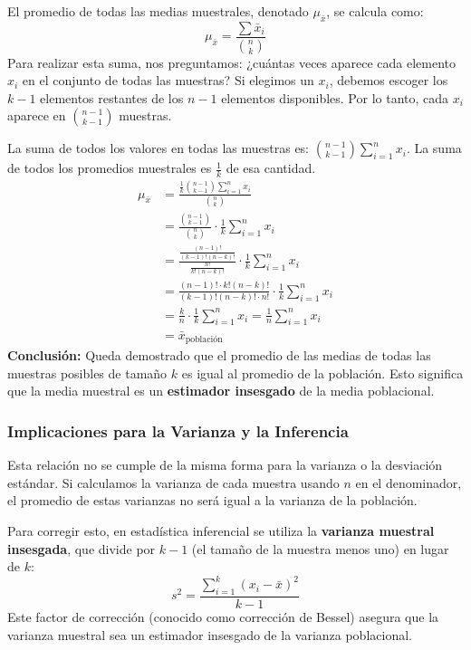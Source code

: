 \documentclass[12pt, letterpaper]{article}
\begin{document}
El promedio de todas las medias muestrales, denotado $\mu_{\bar{x}}$, se calcula como:
\[ \mu_{\bar{x}} = \frac{\sum \bar{x}_i}{\binom{n}{k}} \]
Para realizar esta suma, nos preguntamos: ¿cuántas veces aparece cada elemento $x_i$ en el conjunto de todas las muestras? Si elegimos un $x_i$, debemos escoger los $k-1$ elementos restantes de los $n-1$ elementos disponibles. Por lo tanto, cada $x_i$ aparece en $\binom{n-1}{k-1}$ muestras.

La suma de todos los valores en todas las muestras es: $\binom{n-1}{k-1} \sum_{i=1}^{n} x_i$.
La suma de todos los promedios muestrales es $\frac{1}{k}$ de esa cantidad.
\begin{align*}
	\mu_{\bar{x}} & = \frac{\frac{1}{k} \binom{n-1}{k-1} \sum_{i=1}^{n} x_i}{\binom{n}{k}}                         \\
	              & = \frac{\binom{n-1}{k-1}}{\binom{n}{k}} \cdot \frac{1}{k} \sum_{i=1}^{n} x_i                   \\
	              & = \frac{\frac{(n-1)!}{(k-1)!(n-k)!}}{\frac{n!}{k!(n-k)!}} \cdot \frac{1}{k} \sum_{i=1}^{n} x_i \\
	              & = \frac{(n-1)! \cdot k!(n-k)!}{(k-1)!(n-k)! \cdot n!} \cdot \frac{1}{k} \sum_{i=1}^{n} x_i     \\
	              & = \frac{k}{n} \cdot \frac{1}{k} \sum_{i=1}^{n} x_i = \frac{1}{n} \sum_{i=1}^{n} x_i            \\
	              & = \bar{x}_{\text{población}}
\end{align*}
\textbf{Conclusión:} Queda demostrado que el promedio de las medias de todas las muestras posibles de tamaño $k$ es igual al promedio de la población. Esto significa que la media muestral es un \textbf{estimador insesgado} de la media poblacional.

\subsubsection{Implicaciones para la Varianza y la Inferencia}
Esta relación no se cumple de la misma forma para la varianza o la desviación estándar. Si calculamos la varianza de cada muestra usando $n$ en el denominador, el promedio de estas varianzas no será igual a la varianza de la población.

Para corregir esto, en estadística inferencial se utiliza la \textbf{varianza muestral insesgada}, que divide por $k-1$ (el tamaño de la muestra menos uno) en lugar de $k$:
\[ s^2 = \frac{\sum_{i=1}^{k} (x_i - \bar{x})^2}{k-1} \]
Este factor de corrección (conocido como corrección de Bessel) asegura que la varianza muestral sea un estimador insesgado de la varianza poblacional.
\end{document}

